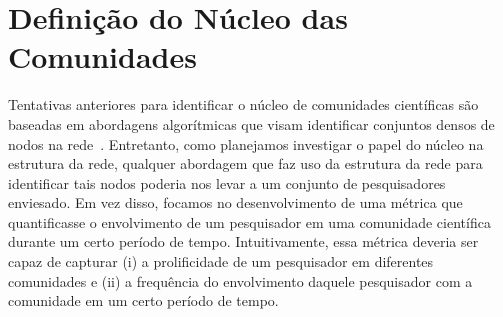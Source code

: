

\section{Definição do Núcleo das Comunidades}

Tentativas anteriores para identificar o núcleo de comunidades científicas são baseadas em abordagens 
algorítmicas que visam identificar conjuntos densos de nodos na rede~\citep{Seifi2012}. Entretanto, 
como planejamos investigar o papel do núcleo na estrutura da rede, qualquer abordagem que faz uso da 
estrutura da rede para identificar tais nodos poderia nos levar a um conjunto de pesquisadores 
enviesado. Em vez disso, focamos no desenvolvimento de uma métrica que quantificasse o envolvimento 
de um pesquisador em uma comunidade científica durante um certo período de tempo. Intuitivamente, 
essa métrica deveria ser capaz de capturar (i) a prolificidade de um pesquisador em diferentes 
comunidades e (ii) a frequência do envolvimento daquele pesquisador com a comunidade em um certo 
período de tempo.


